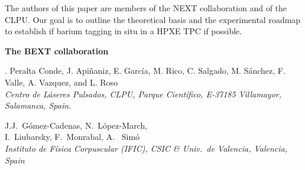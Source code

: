 \begin{titlepage}
\begin{center}
\begin{minipage}{15cm}
The authors of this paper are members of the NEXT collaboration and of the CLPU. Our goal is to outline the theoretical basis and the experimental roadmap to establish if barium tagging in situ in a HPXE TPC if possible.  

\end{minipage}
\end{center}

\begin{center}
\pagebreak 

{\LARGE \bf The BEXT collaboration}

\vspace{0.4cm}

{\small \sc . Peralta Conde, J. Api\~naniz, E. Garc\'ia,  M. Rico, C. Salgado, M. S\'anchez, F. Valle, A. Vazquez, and L. Roso}\\
{\it Centro de L\'aseres Pulsados, CLPU, Parque Cient\'ifico, E-37185 Villamayor, Salamanca, Spain.}

\vspace{0.3cm}

{\small \sc  J.J.~G\'omez-Cadenas, N.~L\'opez-March,  \\I.~Liubarsky, F.~Monrabal, A. ~Simó}\\
{\it Instituto de F\'isica Corpuscular (IFIC), CSIC \& Univ.\ de Valencia, Valencia, Spain}

\end{center}




\end{titlepage}
